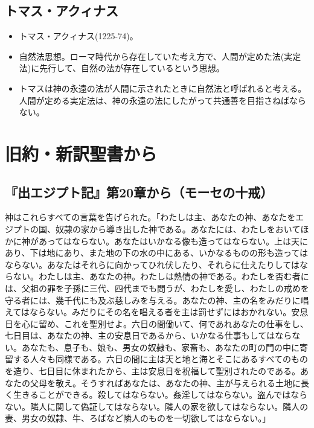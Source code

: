 \documentclass[uplatex,dvipdfmx]{jsarticle} \usepackage{mystyle}%
\begin{document}
\subsection{トマス・アクィナス}
\begin{itemize}
\item トマス・アクィナス(1225-74)。
\item 自然法思想。ローマ時代から存在していた考え方で、人間が定めた法(実定法)に先行して、自然の法が存在しているという思想。
\item トマスは神の永遠の法が人間に示されたときに自然法と呼ばれると考える。人間が定める実定法は、神の永遠の法にしたがって共通善を目指さねばならない。
\end{itemize}




\section{旧約・新訳聖書から}



\subsection*{『出エジプト記』第20章から（モーセの十戒）}

神はこれらすべての言葉を告げられた。「わたしは主、あなたの神、あなたをエジプトの国、奴隷の家から導き出した神である。あなたには、わたしをおいてほかに神があってはならない。あなたはいかなる像も造ってはならない。上は天にあり、下は地にあり、また地の下の水の中にある、いかなるものの形も造ってはならない。あなたはそれらに向かってひれ伏したり、それらに仕えたりしてはならない。わたしは主、あなたの神。わたしは熱情の神である。わたしを否む者には、父祖の罪を子孫に三代、四代までも問うが、わたしを愛し、わたしの戒めを守る者には、幾千代にも及ぶ慈しみを与える。あなたの神、主の名をみだりに唱えてはならない。みだりにその名を唱える者を主は罰せずにはおかれない。安息日を心に留め、これを聖別せよ。六日の間働いて、何であれあなたの仕事をし、七日目は、あなたの神、主の安息日であるから、いかなる仕事もしてはならない。あなたも、息子も、娘も、男女の奴隷も、家畜も、あなたの町の門の中に寄留する人々も同様である。六日の間に主は天と地と海とそこにあるすべてのものを造り、七日目に休まれたから、主は安息日を祝福して聖別されたのである。あなたの父母を敬え。そうすればあなたは、あなたの神、主が与えられる土地に長く生きることができる。殺してはならない。姦淫してはならない。盗んではならない。隣人に関して偽証してはならない。隣人の家を欲してはならない。隣人の妻、男女の奴隷、牛、ろばなど隣人のものを一切欲してはならない。」
\end{document}
